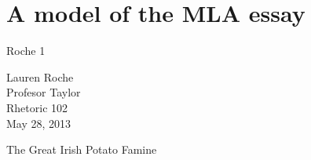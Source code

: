 \section{A model of the MLA essay}

\newpage

\thispagestyle{empty}
\begin{flushright}Roche 1\end{flushright}
\bigskip
\begin{Spacing}{1.5}
Lauren Roche\\
Profesor Taylor\\
Rhetoric 102\\
May 28, 2013
\end{Spacing}
\begin{center}
The Great Irish Potato Famine
\end{center}
